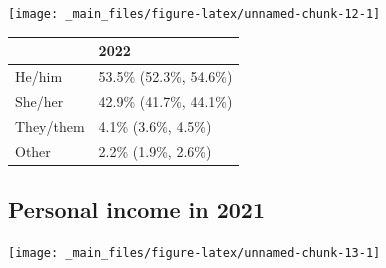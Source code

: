 \documentclass[
]{book}
\begin{document}
\texttt{[image: \_main\_files/figure-latex/unnamed-chunk-12-1]}

\begin{table}
\centering
\begin{tabular}[t]{>{}l|l}
\hline
  & 2022\\
\hline
He/him & 53.5\% (52.3\%, 54.6\%)\\
\hline
She/her & 42.9\% (41.7\%, 44.1\%)\\
\hline
They/them & 4.1\% (3.6\%, 4.5\%)\\
\hline
Other & 2.2\% (1.9\%, 2.6\%)\\
\hline
\end{tabular}
\end{table}

\hypertarget{personal-income-in-2021}{%
\subsection{Personal income in 2021}\label{personal-income-in-2021}}

\texttt{[image: \_main\_files/figure-latex/unnamed-chunk-13-1]}
\end{document}
